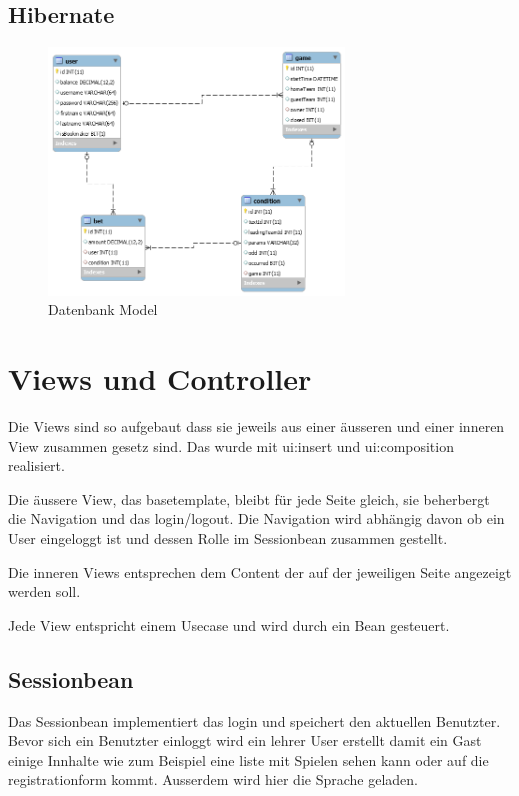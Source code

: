 \documentclass[a4paper, abstracton]{scrartcl}
\begin{document}
\subsection{Hibernate}

\begin{figure}[h!]
  \begin{center}
    \includegraphics[width=0.7\textwidth]{images/db_model.png}
  \end{center}
  \caption{Datenbank Model}
  \label{fig:db_model}
\end{figure}

\section{Views und Controller}

  Die Views sind so aufgebaut dass sie jeweils aus einer äusseren und einer
  inneren View zusammen gesetz sind. Das wurde mit ui:insert und ui:composition
  realisiert.
  
  Die äussere View, das basetemplate, bleibt für jede Seite gleich, sie beherbergt
  die Navigation und das login/logout. Die Navigation wird abhängig davon ob ein User eingeloggt
  ist und dessen Rolle im Sessionbean zusammen gestellt.
  
  Die inneren Views entsprechen dem Content der auf der jeweiligen Seite
  angezeigt werden soll.
  
  Jede View entspricht einem Usecase und wird durch ein Bean gesteuert.


\subsection{Sessionbean}
  Das Sessionbean implementiert das login und speichert den aktuellen Benutzter.
  Bevor sich ein Benutzter einloggt wird ein lehrer User erstellt damit ein Gast
  einige Innhalte wie zum Beispiel eine liste mit Spielen sehen kann oder auf die
  registrationform kommt.
  Ausserdem wird hier die Sprache geladen.
  
\end{document}
